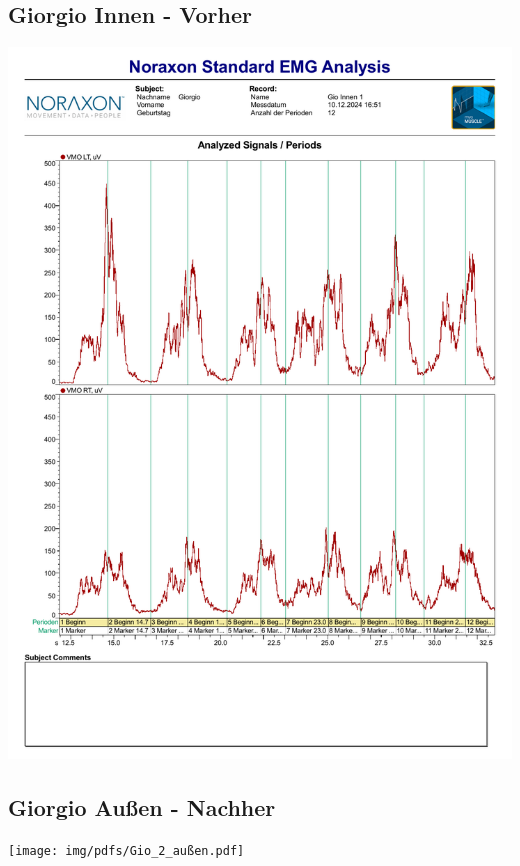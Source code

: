 \subsection*{Giorgio Innen - Vorher}
\includegraphics[width=.9\textwidth]{img/pdfs/Gio_Innen_1.pdf}
\clearpage

\subsection*{Giorgio Außen - Nachher}
\texttt{[image: img/pdfs/Gio\_2\_außen.pdf]}
\clearpage

